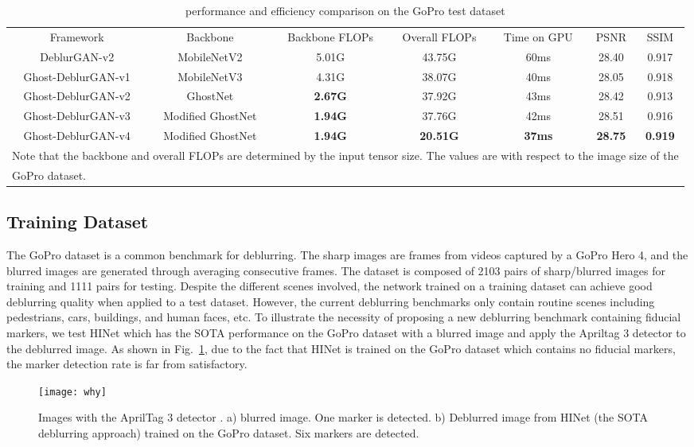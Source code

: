 \documentclass[letterpaper, 10 pt, conference]{ieeeconf}
\begin{document}
\begin{table*}[htbp]
\caption{performance and efficiency comparison on the GoPro test dataset}
\begin{center}
\begin{tabular}{c|c|c|c|c|c|c}
\hline\hline
Framework & Backbone&Backbone FLOPs &Overall FLOPs&Time on GPU &  PSNR &  SSIM   \\
\cline{1-7} 
DeblurGAN-v2 \cite{deblurgan2} & MobileNetV2  & 5.01G &43.75G& 60ms&  28.40 &  0.917 \\ \hline
Ghost-DeblurGAN-v1& MobileNetV3  & 4.31G &38.07G& 40ms& 28.05 & 0.918 \\ \hline
Ghost-DeblurGAN-v2&GhostNet   & \textbf{2.67G} &37.92G& 43ms& 28.42 &  0.913 \\ \hline
Ghost-DeblurGAN-v3&Modified GhostNet   & \textbf{1.94G} &37.76G& 42ms& 28.51 &  0.916 \\ \hline
Ghost-DeblurGAN-v4&Modified GhostNet  & \textbf{1.94G} &\textbf{20.51G}& \textbf{37ms}&  \textbf{28.75} &  \textbf{0.919} \\ \hline\hline
\multicolumn{7}{l}{ Note that the backbone and overall FLOPs are determined by the input tensor size. The values are with respect to the image size of the} \\
\multicolumn{7}{l}{GoPro dataset.}
\end{tabular}
\label{tab1}
\end{center}
\end{table*}



\subsection{Training Dataset}
The GoPro dataset \cite{nah} is a common benchmark for deblurring. The sharp images are frames from videos captured by a GoPro Hero 4, and the blurred images are generated through averaging consecutive frames. The dataset is composed of 2103 pairs of sharp/blurred images for training and 1111 pairs for testing. Despite the different scenes involved, the network trained on a training dataset can achieve good deblurring quality when applied to a test dataset. However, the current deblurring benchmarks only contain routine scenes including pedestrians, cars, buildings, and human faces, etc. To illustrate the necessity of proposing a new deblurring benchmark containing fiducial markers, we test HINet \cite{chen2021hinet} which has the SOTA performance on the GoPro dataset with a blurred image and apply the Apriltag 3 detector \cite{ap3} to the deblurred image. As shown in Fig.~\ref{why}, due to the fact that HINet is trained on the GoPro dataset which contains no fiducial markers, the marker detection rate is far from  satisfactory.
\begin{figure}[thpb]
	\centering
	\texttt{[image: why]}
\caption{Images with the AprilTag 3 detector \cite{ap3}. a) blurred image. One marker is detected. b) Deblurred image from HINet \cite{chen2021hinet} (the SOTA deblurring approach) trained on the GoPro dataset. Six markers are detected.}
	\label{why}
\end{figure}
\end{document}
